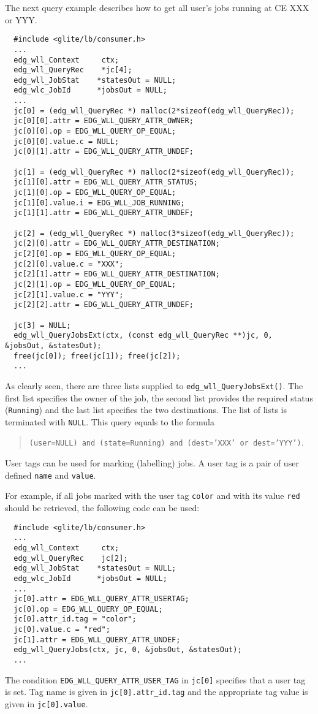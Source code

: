 The next query example describes how to get all user's jobs running at
CE XXX or YYY.
\begin{verbatim}
  #include <glite/lb/consumer.h>
  ...
  edg_wll_Context     ctx;    
  edg_wll_QueryRec    *jc[4];
  edg_wll_JobStat    *statesOut = NULL;
  edg_wlc_JobId      *jobsOut = NULL;
  ...
  jc[0] = (edg_wll_QueryRec *) malloc(2*sizeof(edg_wll_QueryRec));
  jc[0][0].attr = EDG_WLL_QUERY_ATTR_OWNER;
  jc[0][0].op = EDG_WLL_QUERY_OP_EQUAL;
  jc[0][0].value.c = NULL;
  jc[0][1].attr = EDG_WLL_QUERY_ATTR_UNDEF;

  jc[1] = (edg_wll_QueryRec *) malloc(2*sizeof(edg_wll_QueryRec));
  jc[1][0].attr = EDG_WLL_QUERY_ATTR_STATUS;
  jc[1][0].op = EDG_WLL_QUERY_OP_EQUAL;
  jc[1][0].value.i = EDG_WLL_JOB_RUNNING;
  jc[1][1].attr = EDG_WLL_QUERY_ATTR_UNDEF;

  jc[2] = (edg_wll_QueryRec *) malloc(3*sizeof(edg_wll_QueryRec));
  jc[2][0].attr = EDG_WLL_QUERY_ATTR_DESTINATION;
  jc[2][0].op = EDG_WLL_QUERY_OP_EQUAL;
  jc[2][0].value.c = "XXX";
  jc[2][1].attr = EDG_WLL_QUERY_ATTR_DESTINATION;
  jc[2][1].op = EDG_WLL_QUERY_OP_EQUAL;
  jc[2][1].value.c = "YYY";
  jc[2][2].attr = EDG_WLL_QUERY_ATTR_UNDEF;

  jc[3] = NULL;
  edg_wll_QueryJobsExt(ctx, (const edg_wll_QueryRec **)jc, 0, &jobsOut, &statesOut);
  free(jc[0]); free(jc[1]); free(jc[2]);
  ...
\end{verbatim}

As clearly seen, there are three lists supplied to
\texttt{edg\_wll\_QueryJobsExt()}. The first list specifies the owner of the
job, the second list provides the required status (\texttt{Running}) and
the last list specifies the two destinations. 
The list of lists is terminated with \texttt{NULL}.
This query equals to the formula 
\begin{quote}
\texttt{(user=NULL) and (state=Running) and (dest='XXX' or dest='YYY')}.
\end{quote}

\label{JQ_ut}
User tags can be used for marking (labelling) jobs. A user tag is
a pair of user defined \texttt{name} and \texttt{value}. 

\label{JQ_RedJobs}
For example, if all jobs marked with the user tag \texttt{color} and with its
value \texttt{red} should be retrieved, the following code can  be used:
\begin{verbatim}
  #include <glite/lb/consumer.h>
  ...
  edg_wll_Context     ctx;    
  edg_wll_QueryRec    jc[2];
  edg_wll_JobStat    *statesOut = NULL;
  edg_wlc_JobId      *jobsOut = NULL;
  ...
  jc[0].attr = EDG_WLL_QUERY_ATTR_USERTAG;
  jc[0].op = EDG_WLL_QUERY_OP_EQUAL;
  jc[0].attr_id.tag = "color";
  jc[0].value.c = "red";
  jc[1].attr = EDG_WLL_QUERY_ATTR_UNDEF;
  edg_wll_QueryJobs(ctx, jc, 0, &jobsOut, &statesOut);
  ...
\end{verbatim}
The condition \texttt{EDG\_WLL\_QUERY\_ATTR\_USER\_TAG} in \texttt{jc[0]}
specifies that a user tag is set. Tag name is given in
\texttt{jc[0].attr\_id.tag} and the appropriate tag
value is given in \texttt{jc[0].value}.



